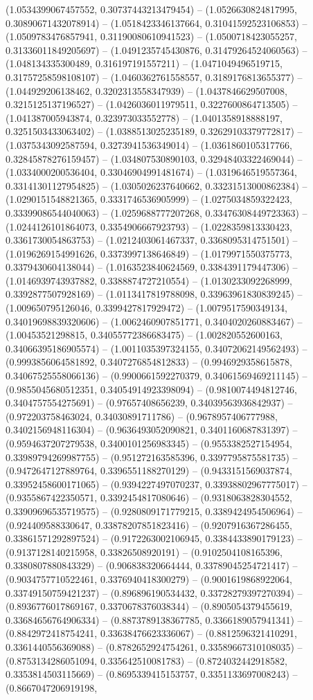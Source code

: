 (1.0534399067457552, 0.30737443213479454) -- (1.0526630824817995, 0.30890671432078914) -- (1.0518423346137664, 0.31041592523106853) -- (1.0509783476857941, 0.31190080610941523) -- (1.0500718423055257, 0.31336011849205697) -- (1.0491235745430876, 0.31479264524060563) -- (1.048134335300489, 0.316197191557211) -- (1.0471049496519715, 0.31757258598108107) -- (1.0460362761558557, 0.3189176813655377) -- (1.044929206138462, 0.3202313558347939) -- (1.0437846629507008, 0.3215125137196527) -- (1.0426036011979511, 0.3227600864713505) -- (1.041387005943874, 0.323973033552778) -- (1.0401358918888197, 0.3251503433063402) -- (1.0388513025235189, 0.32629103379772817) -- (1.0375343092587594, 0.3273941536349014) -- (1.0361860105317766, 0.32845878276159457) -- (1.034807530890103, 0.32948403322469044) -- (1.0334000200536404, 0.33046904991481674) -- (1.0319646519557364, 0.33141301127954825) -- (1.0305026237640662, 0.33231513000862384) -- (1.0290151548821365, 0.3331746536905999) -- (1.0275034859322423, 0.33399086544040063) -- (1.0259688777207268, 0.33476308449723363) -- (1.0244126101864073, 0.3354906667923793) -- (1.0228359813330423, 0.3361730054863753) -- (1.0212403061467337, 0.3368095314751501) -- (1.0196269154991626, 0.3373997138646849) -- (1.0179971550375773, 0.3379430604138044) -- (1.0163523840624569, 0.3384391179447306) -- (1.0146939743937882, 0.3388874727210554) -- (1.0130233092268999, 0.3392877507928169) -- (1.0113417819788098, 0.33963961830839245) -- (1.009650795126046, 0.3399427817929472) -- (1.0079517590349134, 0.34019698839320606) -- (1.0062460907851771, 0.3404020260883467) -- (1.00453521298815, 0.34055772386683475) -- (1.002820552600163, 0.34066395186905574) -- (1.0011035397324155, 0.34072062149562493) -- (0.9993856064581892, 0.3407276854812833) -- (0.9946929358615878, 0.34067525558066136) -- (0.9900661592270379, 0.34061569469211145) -- (0.9855045680512351, 0.34054914923398094) -- (0.9810074494812746, 0.3404757554275691) -- (0.97657408656239, 0.34039563936842937) -- (0.972203758463024, 0.34030891711786) -- (0.9678957406777988, 0.3402156948116304) -- (0.9636493052090821, 0.3401160687831397) -- (0.9594637207279538, 0.3400101256983345) -- (0.9553382527154954, 0.33989794269987755) -- (0.951272163585396, 0.3397795875581735) -- (0.9472647127889764, 0.3396551188270129) -- (0.9433151569037874, 0.33952458600171065) -- (0.9394227497070237, 0.33938802967775017) -- (0.9355867422350571, 0.3392454817080646) -- (0.9318063828304552, 0.33909696535719575) -- (0.9280809171779215, 0.3389424954506964) -- (0.924409588330647, 0.33878207851823416) -- (0.9207916367286455, 0.33861571292897524) -- (0.9172263002106945, 0.3384433890179123) -- (0.9137128140215958, 0.33826508920191) -- (0.9102504108165396, 0.3380807880843329) -- (0.906838320664444, 0.33789045254721417) -- (0.9034757710522461, 0.3376940418300279) -- (0.9001619868922064, 0.33749150759421237) -- (0.896896190534432, 0.33728279397270394) -- (0.8936776017869167, 0.3370678376038344) -- (0.8905054379455619, 0.33684656764906334) -- (0.8873789138367785, 0.3366189057941341) -- (0.8842972418754241, 0.33638476623336067) -- (0.8812596321410291, 0.3361440556369088) -- (0.8782652924754261, 0.33589667310108035) -- (0.8753134286051094, 0.335642510081783) -- (0.8724032442918582, 0.3353814503115669) -- (0.8695339415153757, 0.3351133697008243) -- (0.8667047206919198, 